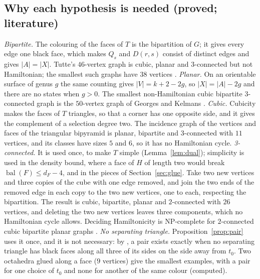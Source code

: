 \documentclass[10pt]{amsart}
\numberwithin{equation}{section}
\theoremstyle{definition}
\theoremstyle{remark}
\newcommand{\T}{T}
\newcommand{\bal}{\operatorname{bal}}
\begin{document}
\subsection*{Why each hypothesis is needed (proved; literature)}
\emph{Bipartite.} The colouring of the faces of $\T$ is the bipartition of $G$; it gives every edge one black face, which makes $Q_s$ and $D(r,s)$ consist of distinct edges and gives $|A|=|X|$.
Tutte's $46$-vertex graph \cite{tutte1946} is cubic, planar and $3$-connected but not Hamiltonian; the smallest such graphs have $38$ vertices \cite{holton-mckay1988}.
\emph{Planar.} On an orientable surface of genus $g$ the same counting gives $|V|=k+2-2g$, so $|X|=|A|-2g$ and there are no states when $g>0$. The smallest non-Hamiltonian cubic bipartite $3$-connected graph is the $50$-vertex graph of Georges and Kelmans \cite{georges1989,bgm2021}.
\emph{Cubic.} Cubicity makes the faces of $\T$ triangles, so that a corner has one opposite side, and it gives the complement of a selection degree two. The incidence graph of the vertices and faces of the triangular bipyramid is planar, bipartite and $3$-connected with $11$ vertices, and its classes have sizes $5$ and $6$, so it has no Hamiltonian cycle.
\emph{3-connected.} It is used once, to make $\T$ simple (Lemma~\ref{lem:dual}); simplicity is used in the density bound, where a face of $H$ of length two would break $\bal(F)\le d_F-4$, and in the pieces of Section~\ref{sec:glue}. Take two new vertices and three copies of the cube with one edge removed, and join the two ends of the removed edge in each copy to the two new vertices, one to each, respecting the bipartition. The result is cubic, bipartite, planar and $2$-connected with $26$ vertices, and deleting the two new vertices leaves three components, which no Hamiltonian cycle allows. Deciding Hamiltonicity is NP-complete for $2$-connected cubic bipartite planar graphs \cite{ans1980}.
\emph{No separating triangle.} Proposition~\ref{prop:pair} uses it once, and it is not necessary: by \cite[Theorem~1.2]{constructive2026}, a pair exists exactly when no separating triangle has black faces along all three of its sides on the side away from $t_0$. Two octahedra glued along a face ($9$ vertices) give the smallest examples, with a pair for one choice of $t_0$ and none for another of the same colour (computed).
\end{document}
